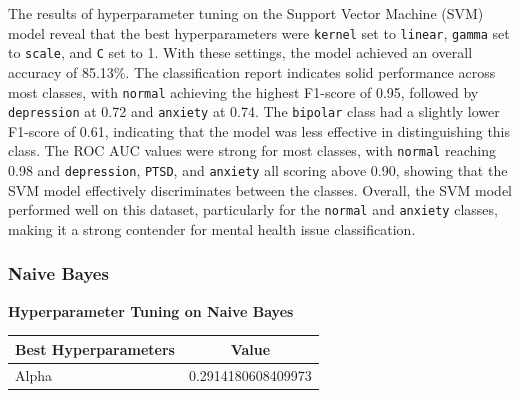 \noindent
The results of hyperparameter tuning on the Support Vector Machine (SVM) model reveal that the best hyperparameters were \texttt{kernel} set to \texttt{linear}, \texttt{gamma} set to \texttt{scale}, and \texttt{C} set to 1. With these settings, the model achieved an overall accuracy of 85.13\%. The classification report indicates solid performance across most classes, with \texttt{normal} achieving the highest F1-score of 0.95, followed by \texttt{depression} at 0.72 and \texttt{anxiety} at 0.74. The \texttt{bipolar} class had a slightly lower F1-score of 0.61, indicating that the model was less effective in distinguishing this class. The ROC AUC values were strong for most classes, with \texttt{normal} reaching 0.98 and \texttt{depression}, \texttt{PTSD}, and \texttt{anxiety} all scoring above 0.90, showing that the SVM model effectively discriminates between the classes. Overall, the SVM model performed well on this dataset, particularly for the \texttt{normal} and \texttt{anxiety} classes, making it a strong contender for mental health issue classification.


\pagebreak
\subsubsection{Naive Bayes}
\begin{center}
    \textbf{Hyperparameter Tuning on Naive Bayes} \\[0.5em]
    \begin{tabular}{|l|c|}
        \hline
        \textbf{Best Hyperparameters}  & \textbf{Value} \\ \hline
        Alpha                         & 0.2914180608409973 \\ \hline
    \end{tabular}
\end{center}

